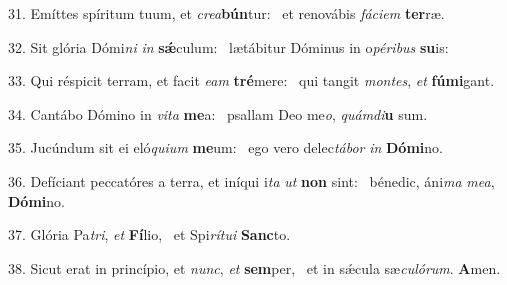 31. Emíttes spíritum tuum, et \textit{cre}\textit{a}\textbf{bún}tur: \ast\  et renovábis \textit{fá}\textit{ci}\textit{em} \textbf{ter}ræ.\

32. Sit glória Dómi\textit{ni} \textit{in} \textbf{sǽ}culum: \ast\  lætábitur Dóminus in o\textit{pé}\textit{ri}\textit{bus} \textbf{su}is:\

33. Qui réspicit terram, et facit \textit{e}\textit{am} \textbf{tré}mere: \ast\  qui tangit \textit{mon}\textit{tes}, \textit{et} \textbf{fú}\textbf{mi}gant.\

34. Cantábo Dómino in \textit{vi}\textit{ta} \textbf{me}a: \ast\  psallam Deo me\textit{o}, \textit{quám}\textit{di}\textbf{u} sum.\

35. Jucúndum sit ei eló\textit{qui}\textit{um} \textbf{me}um: \ast\  ego vero delec\textit{tá}\textit{bor} \textit{in} \textbf{Dó}\textbf{mi}no.\

36. Defíciant peccatóres a terra, et iníqui i\textit{ta} \textit{ut} \textbf{non} sint: \ast\  bénedic, áni\textit{ma} \textit{me}\textit{a}, \textbf{Dó}\textbf{mi}no.\

37. Glória Pa\textit{tri}, \textit{et} \textbf{Fí}lio, \ast\  et Spi\textit{rí}\textit{tu}\textit{i} \textbf{Sanc}to.\

38. Sicut erat in princípio, et \textit{nunc}, \textit{et} \textbf{sem}per, \ast\  et in sǽcula sæ\textit{cu}\textit{ló}\textit{rum}. \textbf{A}men.\

